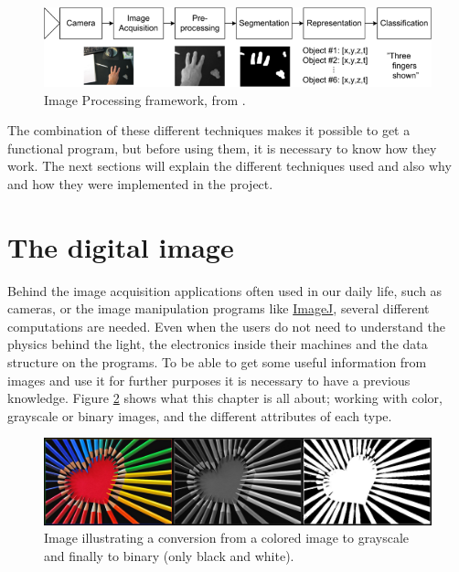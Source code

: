 \begin{figure}[htbp]
\centering
\includegraphics[width=1.00\textwidth]{Pictures/Theory/imageProcessing_steps.png}
\caption{Image Processing framework, from \citep{ip_book}.}
\label{fig:ip_framework}
\end{figure}


The combination of these different techniques makes it possible to get a functional program, but before using them, it is necessary to know how they work. The next sections will explain the different techniques used and also why and how they were implemented in the project. 

\section{The digital image}
Behind the image acquisition applications often used in our daily life, such as cameras, or the image manipulation programs like \href{http://rsbweb.nih.gov/ij/}{ImageJ}, several different computations are needed. Even when the users do not need to understand the physics behind the light, the electronics inside their machines and the data structure on the programs. To be able to get some useful information from images and use it for further purposes it is necessary to have a previous knowledge. Figure \ref{fig:ip_ColoredToGrayscaleToBinary} shows what this chapter is all about; working with color, grayscale or binary images, and the different attributes of each type.

\begin{figure}[htbp]
\centering
\includegraphics[width=1.00\textwidth]{Pictures/Theory/ColoredToGrayscaleToBinary.jpg}
\caption{Image illustrating a conversion from a colored image to grayscale and finally to binary (only black and white).}
\label{fig:ip_ColoredToGrayscaleToBinary}
\end{figure}

